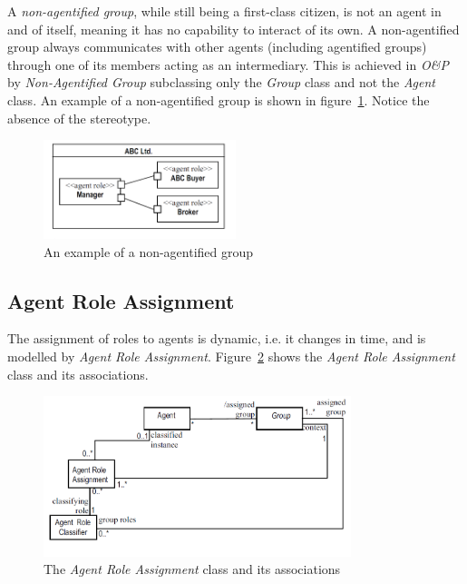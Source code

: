 A \textit{non-agentified group}, while still being a first-class citizen, is not an agent in and of itself, meaning it has no capability to interact of its own.
A non-agentified group always communicates with other agents (including agentified groups) through one of its members acting as an intermediary.
This is achieved in \textit{O\&P} by \textit{Non-Agentified Group} subclassing only the \textit{Group} class and not the \textit{Agent} class.
An example of a non-agentified group is shown in figure~\ref{figure:onp-non-agentified-group}.
Notice the absence of the  stereotype.

\begin{figure}[ht]
	\centering
	\includegraphics[width=0.5\textwidth]{images/onp/non-agentified-group.png}
	\caption{An example of a non-agentified group \cite{Odell05}}
	\label{figure:onp-non-agentified-group}
\end{figure}

\subsection{Agent Role Assignment}

The assignment of roles to agents is dynamic, i.e. it changes in time, and is modelled by \textit{Agent Role Assignment}.
Figure~\ref{figure:onp-agent-role-assignment} shows the \textit{Agent Role Assignment} class and its associations.

\begin{figure}[ht]
	\centering
	\includegraphics[width=0.8\textwidth]{images/onp/agent-role-assignment.png}
	\caption{The \textit{Agent Role Assignment} class and its associations \cite{Odell05}}
	\label{figure:onp-agent-role-assignment}
\end{figure}

